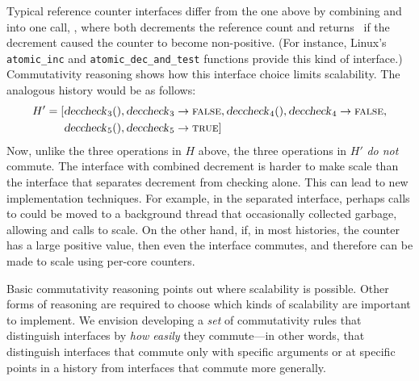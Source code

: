Typical reference counter interfaces differ from the one above by
combining  and  into one call, , where
 both decrements the reference count and returns
\TRUE\ if the decrement caused the counter to become non-positive.
%
(For instance, Linux's \verb+atomic_inc+ and \verb+atomic_dec_and_test+
functions provide this kind of interface.)
%
Commutativity reasoning shows how this interface choice limits
scalability.
%
The analogous history would be as follows:
%
\begin{align*}
H' = [&\text{\textsl{deccheck}}_{3}(), \text{\textsl{deccheck}}_{3} \rightarrow \textsc{false},
	\text{\textsl{deccheck}}_{4}(), \text{\textsl{deccheck}}_{4} \rightarrow \textsc{false}, \\
&\text{\textsl{deccheck}}_{5}(), \text{\textsl{deccheck}}_{5} \rightarrow \textsc{true}]
\end{align*}
%
Now, unlike the three  operations in $H$ above, the three
 operations in $H'$ \emph{do not}
commute.
%
The interface with combined decrement is harder to make scale than
the interface that separates decrement from checking alone.
%
This can lead to new implementation techniques.
%
For example, in the separated interface, perhaps
calls to  could be moved to a background
thread that occasionally collected garbage, allowing  and
 calls to scale.
%
On the other hand, if, in most histories, the counter has a large
positive value, then even the  interface commutes, and
therefore can be made to scale using per-core counters.

Basic commutativity reasoning points out where scalability is possible.
%
Other forms of reasoning are required to choose which kinds of
scalability are important to implement.
%
We envision developing a \emph{set} of commutativity rules that
distinguish interfaces by \emph{how easily} they commute---in other
words, that distinguish interfaces that commute only with specific
arguments or at specific points in a history from interfaces that
commute more generally.


